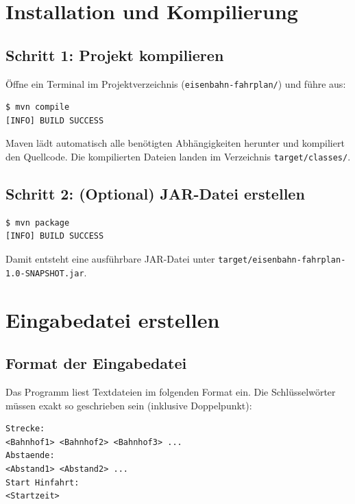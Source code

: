 \documentclass[12pt,a4paper]{article}
\begin{document}
\section{Installation und Kompilierung}

\subsection{Schritt 1: Projekt kompilieren}

Öffne ein Terminal im Projektverzeichnis (\texttt{eisenbahn-fahrplan/}) und führe aus:

\begin{lstlisting}[style=terminal]
$ mvn compile
[INFO] BUILD SUCCESS
\end{lstlisting}

Maven lädt automatisch alle benötigten Abhängigkeiten herunter und kompiliert den Quellcode. Die kompilierten Dateien landen im Verzeichnis \texttt{target/classes/}.

\subsection{Schritt 2: (Optional) JAR-Datei erstellen}

\begin{lstlisting}[style=terminal]
$ mvn package
[INFO] BUILD SUCCESS
\end{lstlisting}

Damit entsteht eine ausführbare JAR-Datei unter \texttt{target/eisenbahn-fahrplan-1.0-SNAPSHOT.jar}.

\section{Eingabedatei erstellen}

\subsection{Format der Eingabedatei}

Das Programm liest Textdateien im folgenden Format ein. Die Schlüsselwörter müssen exakt so geschrieben sein (inklusive Doppelpunkt):

\begin{lstlisting}[caption={Aufbau einer Eingabedatei}]
Strecke:
<Bahnhof1> <Bahnhof2> <Bahnhof3> ...
Abstaende:
<Abstand1> <Abstand2> ...
Start Hinfahrt:
<Startzeit>
\end{lstlisting}
\end{document}
